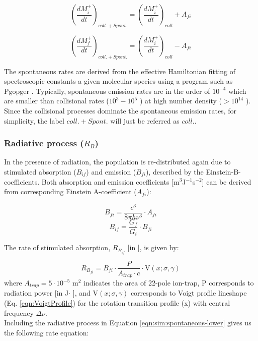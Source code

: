 \begin{equation}
    \left( \frac{dM^+_i}{dt} \right) _{coll. + Spont.} = \left( \frac{dM^+_i}{dt} \right) _{coll} + A_{fi}
    \label{eqn:sim:spontaneous-lower}
\end{equation}

\begin{equation}
    \left( \frac{dM^+_f}{dt} \right) _{coll. + Spont.} = \left( \frac{dM^+_i}{dt} \right) _{coll} - A_{fi}
    \label{eqn:sim:spontaneous-upper}
\end{equation}

The spontaneous rates are derived from the effective Hamiltonian fitting of spectroscopic constants a given molecular species using a program such as Pgopger \cite{western_pgopher_2017}. Typically, spontaneous emission rates are in the order of  $10^{-4}$ \pers which are smaller than collisional rates ($10^{3}-10^{5}$ \pers) at high number density ($>10^{14}$ \percc). Since the collisional processes dominate the spontaneous emission rates, for simplicity, the label $coll. + Spont.$ will just be referred as $coll.$.\\

\subsubsection{Radiative process (\texorpdfstring{$R_B$}{R_B})}
\label{subsec:ROSAA-simulation-rad}

In the presence of radiation, the population is re-distributed again due to stimulated absorption ($B_{if}$) and emission ($B_{fi}$), described by the Einstein-B-coefficients. Both absorption and emission coefficients [m$^3$J$^{-1}$s$^{-2}$] can be derived from corresponding Einstein A-coefficient ($A_{fi}$):

\[ B_{fi} = \frac{c^3}{8\pi h \nu ^3} \cdot A_{fi} \]
\[ B_{if} = \frac{G_f}{G_i} \cdot B_{fi} \]

The rate of stimulated absorption, $R_{B_{if}}$ [in \pers], is given by:

\[ R_{B_{fi}} = B_{fi} \cdot \frac{P}{A_{trap} \cdot c} \cdot \text{V}(x;\sigma, \gamma) \]
where $A_{trap}=5 \cdot 10^{-5}$ m$^2$ indicates the area of 22-pole ion-trap, P corresponds to radiation power [in J$\cdot$ \pers], and $\text{V}(x;\sigma, \gamma)$ corresponds to Voigt profile lineshape (Eq. \ref{eqn:VoigtProfile}) for the rotation transition profile (x) with central frequency $\Delta \nu$.\\

Including the radiative process in Equation \ref{eqn:sim:spontaneous-lower} gives us the following rate equation:

